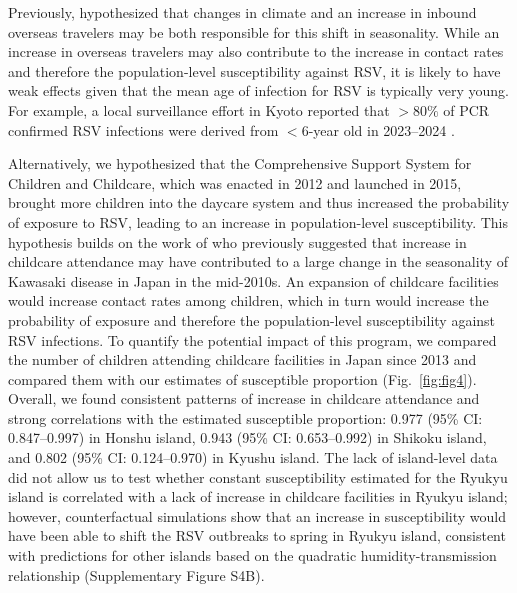 \documentclass[12pt]{article}
\newcommand{\fref}[1]{Fig.~\ref{fig:#1}}
\begin{document}
Previously, \cite{wagatsuma2021shifts} hypothesized that changes in climate and an increase in inbound overseas travelers may be both responsible for this shift in seasonality.
While an increase in overseas travelers may also contribute to the increase in contact rates and therefore the population-level susceptibility against RSV, it is likely to have weak effects given that the mean age of infection for RSV is typically very young.
For example, a local surveillance effort in Kyoto reported that $>80\%$ of PCR confirmed RSV infections were derived from $<6$-year old in 2023--2024 \citep{matsumura2025epidemiology}.

Alternatively, we hypothesized that the Comprehensive Support System for Children and Childcare, which was enacted in 2012 and launched in 2015, brought more children into the daycare system and thus increased the probability of exposure to RSV, leading to an increase in population-level susceptibility.
This hypothesis builds on the work of \cite{dehaan2024age} who previously suggested that increase in childcare attendance may have contributed to a large change in the seasonality of Kawasaki disease in Japan in the mid-2010s.
An expansion of childcare facilities would increase contact rates among children, which in turn would increase the probability of exposure and therefore the population-level susceptibility against RSV infections.
To quantify the potential impact of this program, we compared the number of children attending childcare facilities in Japan since 2013 and compared them with our estimates of susceptible proportion (\fref{fig4}).
Overall, we found consistent patterns of increase in childcare attendance and strong correlations with the estimated susceptible proportion: 0.977 (95\% CI: 0.847--0.997) in Honshu island, 0.943 (95\% CI: 0.653--0.992) in Shikoku island, and 0.802 (95\% CI: 0.124--0.970) in Kyushu island.
The lack of island-level data did not allow us to test whether constant susceptibility estimated for the Ryukyu island is correlated with a lack of increase in childcare facilities in Ryukyu island;
however, counterfactual simulations show that an increase in susceptibility would have been able to shift the RSV outbreaks to spring in Ryukyu island, consistent with predictions for other islands based on the quadratic humidity-transmission relationship (Supplementary Figure S4B).
\end{document}
